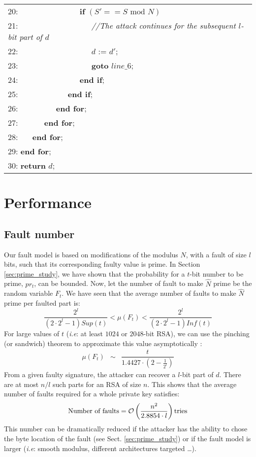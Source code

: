 \documentclass{article}
\begin{document}
\begin{table}[htbp]
\begin{center}
\begin{tabular}{l}
20: ~~~~~~~~~~~~~~~\textbf{if} $\left( S' == S \mbox{ mod } N \right)$\\
21: ~~~~~~~~~~~~~~~~~~\textit{//The attack continues for the subsequent $l$-bit part of $d$}\\
22: ~~~~~~~~~~~~~~~~~~$d$ := $d'$;\\
23: ~~~~~~~~~~~~~~~~~~\textbf{goto} $line\_6$;\\
24: ~~~~~~~~~~~~~~~\textbf{end if};\\
25: ~~~~~~~~~~~~\textbf{end if};\\
26: ~~~~~~~~~\textbf{end for};\\
27: ~~~~~~\textbf{end for};\\
28: ~~~\textbf{end for};\\
29: \textbf{end for};\\
30: \textbf{return} $d$;\\
\hline
\end{tabular}
\end{center}
\end{table}

\section{Performance}

\subsection{Fault number}
Our fault model is based on modifications of the modulus $N$, with
a fault of size $l$ bits, such that its corresponding faulty value is prime. 
In Section \ref{sec:prime_study}, we have shown that the probability
for a $t$-bit number to be prime, $pr_t$, can be bounded. Now, let the
number of fault to make $\hat{N}$ prime be the random variable
${F_t}$. 
We have seen that the average number of faults to make $\hat{N}$ prime
per faulted part is:
\begin{equation}
\dfrac{2^l}{(2\cdot 2^l -1)S\!u\!p(t)} < \mu \left( {F_t}\right) < \dfrac{2^l}{(2\cdot 2^l -1)I\!n\!f(t)} 
\end{equation}
For large values of $t$ (\textit{i.e}: at least $1024$ or $2048$-bit
RSA), we can use the pinching (or sandwich) theorem to approximate
this value asymptotically :
\begin{eqnarray}
 \mu \left( {F_t}\right) & \sim & \dfrac{t}{1.4427\cdot(2-\frac{1}{2^l})} 
\end{eqnarray}
From a given faulty signature, the attacker can recover a $l$-bit part
of $d$. There are at most $n/l$ such parts for an RSA of size $n$.
This shows that the average number of faults required for a whole
private key satisfies:
\begin{equation}
  \mbox{Number of faults} = {\cal O}\left( \dfrac{n^2}{2.8854 \cdot l}\right) \mbox{tries}
\end{equation}
This number can be dramatically reduced if the attacker has the
ability to chose the byte location of the fault (see
Sect. \ref{sec:prime_study}) or if the fault model is larger
(\textit{i.e}: smooth modulus, different architectures targeted
\ldots).
\end{document}
